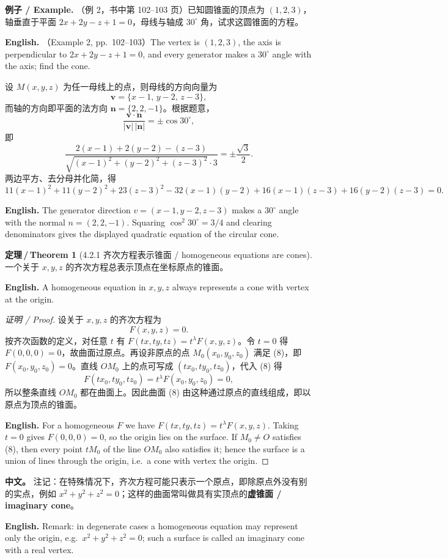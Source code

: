 \documentclass[UTF8,11pt,a4paper]{ctexart}
\newcommand{\APS}[2]{\par\noindent\textbf{中文。} #1\par\noindent\textbf{English.} #2\par\smallskip}
\newcommand{\EN}[1]{\par\noindent \textbf{English.} #1\par}
\newcommand{\EX}[2]{\par\noindent \textbf{例子 / Example.} #1\par\EN{#2}}
\theoremstyle{definition}
\newtheorem*{theorem}{定理\,/\,Theorem}
\newcommand{\vv}[1]{\mathbf{#1}}
\begin{document}
\EX{（例 2，书中第 102--103 页）已知圆锥面的顶点为 $(1,2,3)$，轴垂直于平面 $2x+2y-z+1=0$，母线与轴成 $30^\circ$ 角，试求这圆锥面的方程。}{（Example 2, pp.~102--103）The vertex is $(1,2,3)$, the axis is perpendicular to $2x+2y-z+1=0$, and every generator makes a $30^\circ$ angle with the axis; find the cone.}
设 $M(x,y,z)$ 为任一母线上的点，则母线的方向向量为
\[
\vv{v}=\{x-1,\,y-2,\,z-3\},
\]
而轴的方向即平面的法方向 $\vv{n}=\{2,2,-1\}$。根据题意，
\[
\frac{\vv{v}\cdot\vv{n}}{|\vv{v}|\,|\vv{n}|}=\pm\cos 30^\circ,
\]
即
\[
\frac{2(x-1)+2(y-2)-(z-3)}{\sqrt{(x-1)^2+(y-2)^2+(z-3)^2}\cdot 3}=\pm\frac{\sqrt3}{2}.
\]
两边平方、去分母并化简，得
\[
11(x-1)^2+11(y-2)^2+23(z-3)^2-32(x-1)(y-2)+16(x-1)(z-3)+16(y-2)(z-3)=0.
\]
\EN{The generator direction $v=(x-1,y-2,z-3)$ makes a $30^\circ$ angle with the normal $n=(2,2,-1)$. Squaring $\cos^2 30^\circ=3/4$ and clearing denominators gives the displayed quadratic equation of the circular cone.}

\begin{theorem}[4.2.1 齐次方程表示锥面 / homogeneous equations are cones]\label{thm:cone}
一个关于 $x,y,z$ 的齐次方程总表示顶点在坐标原点的锥面。
\EN{A homogeneous equation in $x,y,z$ always represents a cone with vertex at the origin.}
\end{theorem}

\begin{proof}[证明 / Proof]
设关于 $x,y,z$ 的齐次方程为
\[
F(x,y,z)=0.\tag{8}
\]
按齐次函数的定义，对任意 $t$ 有 $F(tx,ty,tz)=t^\lambda F(x,y,z)$。令 $t=0$ 得 $F(0,0,0)=0$，故曲面过原点。再设非原点的点 $M_0(x_0,y_0,z_0)$ 满足 (8)，即 $F(x_0,y_0,z_0)=0$。直线 $OM_0$ 上的点可写成 $(tx_0,ty_0,tz_0)$，代入 (8) 得
\[
F(tx_0,ty_0,tz_0)=t^\lambda F(x_0,y_0,z_0)=0,
\]
所以整条直线 $OM_0$ 都在曲面上。因此曲面 (8) 由这种通过原点的直线组成，即以原点为顶点的锥面。
\EN{For a homogeneous $F$ we have $F(tx,ty,tz)=t^\lambda F(x,y,z)$. Taking $t=0$ gives $F(0,0,0)=0$, so the origin lies on the surface. If $M_0\ne O$ satisfies (8), then every point $tM_0$ of the line $OM_0$ also satisfies it; hence the surface is a union of lines through the origin, i.e.\ a cone with vertex the origin.}
\end{proof}

\APS{注记：在特殊情况下，齐次方程可能只表示一个原点，即除原点外没有别的实点，例如 $x^2+y^2+z^2=0$；这样的曲面常叫做具有实顶点的\textbf{虚锥面 / imaginary cone}。}{Remark: in degenerate cases a homogeneous equation may represent only the origin, e.g.\ $x^2+y^2+z^2=0$; such a surface is called an imaginary cone with a real vertex.}
\end{document}
